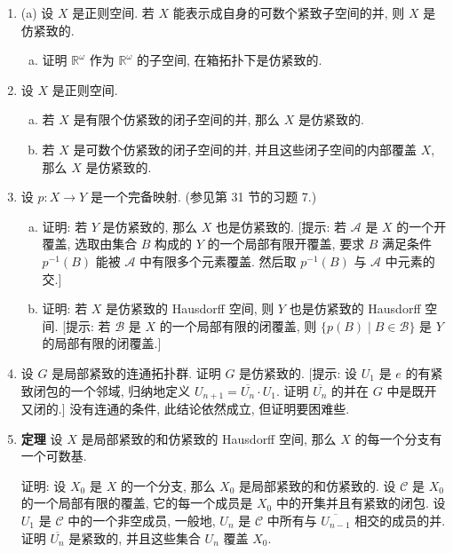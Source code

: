\documentclass[../../main.tex]{subfiles}
\begin{document}
\begin{enumerate}
\textbf{引理} 设 $\{B_\alpha\}_{\alpha\in J}$ 是仿紧致的 Hausdorff 空间 $X$ 的子集构成的局部有限的加标族. 则存在 $X$ 的开子集构成的局部有限的加标族 $\{U_\alpha\}_{\alpha\in J}$, 使得对于每一个 $\alpha$, $B_\alpha\subset U_\alpha$.
\item (a) 设 $X$ 是正则空间. 若 $X$ 能表示成自身的可数个紧致子空间的并, 则 $X$ 是仿紧致的.
\begin{enumerate}[(b)]
\item 证明 $\mathbb{R}^\omega$ 作为 $\mathbb{R}^\omega$ 的子空间, 在箱拓扑下是仿紧致的.
\end{enumerate}
\item 设 $X$ 是正则空间.
\begin{enumerate}[(a)]
\item 若 $X$ 是有限个仿紧致的闭子空间的并, 那么 $X$ 是仿紧致的.
\item 若 $X$ 是可数个仿紧致的闭子空间的并, 并且这些闭子空间的内部覆盖 $X$, 那么 $X$ 是仿紧致的.
\end{enumerate}
\item 设 $p\colon X\to Y$ 是一个完备映射. (参见第 31 节的习题 7.)
\begin{enumerate}[(a)]
\item 证明: 若 $Y$ 是仿紧致的, 那么 $X$ 也是仿紧致的. [提示: 若 $\mathcal{A}$ 是 $X$ 的一个开覆盖, 选取由集合 $B$ 构成的 $Y$ 的一个局部有限开覆盖, 要求 $B$ 满足条件 $p^{-1}(B)$ 能被 $\mathcal{A}$ 中有限多个元素覆盖. 然后取 $p^{-1}(B)$ 与 $\mathcal{A}$ 中元素的交.]
\item 证明: 若 $X$ 是仿紧致的 Hausdorff 空间, 则 $Y$ 也是仿紧致的 Hausdorff 空间. [提示: 若 $\mathcal{B}$ 是 $X$ 的一个局部有限的闭覆盖, 则 $\{p(B)\mid B\in\mathcal{B}\}$ 是 $Y$ 的局部有限的闭覆盖.]
\end{enumerate}
\item 设 $G$ 是局部紧致的连通拓扑群. 证明 $G$ 是仿紧致的. [提示: 设 $U_1$ 是 $e$ 的有紧致闭包的一个邻域, 归纳地定义 $U_{n+1}=\overline{U_n}\cdot U_1$. 证明 $\overline{U_n}$ 的并在 $G$ 中是既开又闭的.] 没有连通的条件, 此结论依然成立, 但证明要困难些.
\item \textbf{定理} 设 $X$ 是局部紧致的和仿紧致的 Hausdorff 空间, 那么 $X$ 的每一个分支有一个可数基.

证明: 设 $X_0$ 是 $X$ 的一个分支, 那么 $X_0$ 是局部紧致的和仿紧致的. 设 $\mathcal{C}$ 是 $X_0$ 的一个局部有限的覆盖, 它的每一个成员是 $X_0$ 中的开集并且有紧致的闭包. 设 $U_1$ 是 $\mathcal{C}$ 中的一个非空成员, 一般地, $U_n$ 是 $\mathcal{C}$ 中所有与 $\overline{U_{n-1}}$ 相交的成员的并. 证明 $\overline{U_n}$ 是紧致的, 并且这些集合 $U_n$ 覆盖 $X_0$.
\end{enumerate}
\end{document}
